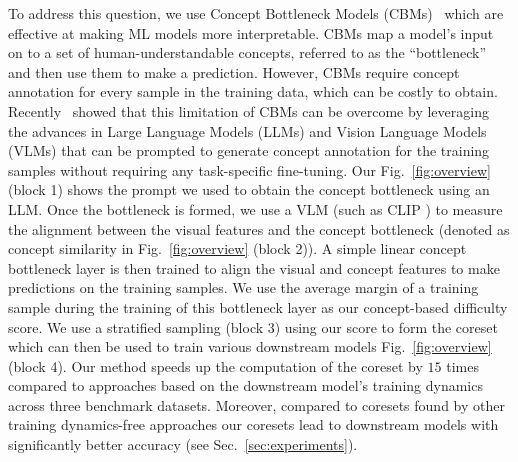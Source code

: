 To address this question, we use Concept Bottleneck Models (CBMs)~\cite{koh2020concept,yuksekgonul2022post} which are effective at making ML models more interpretable. 
CBMs map a model's input on to a set of human-understandable concepts, referred to as the ``bottleneck'' and then use them to make a prediction. 
However, CBMs require concept annotation for every sample in the training data, which can be costly to obtain. 
Recently~\cite{yang2023language,yan2023learning} showed that this limitation of CBMs can be overcome by leveraging the advances in Large Language Models (LLMs) and Vision Language Models (VLMs) that can be prompted to generate concept annotation for the training samples without requiring any task-specific fine-tuning.  
Our Fig.~\ref{fig:overview} (block 1) shows the prompt we used to obtain the concept bottleneck using an LLM.
Once the bottleneck is formed, we use a VLM (such as CLIP \cite{radford2021learning}) to measure the alignment between the visual features and the concept bottleneck (denoted as concept similarity in Fig.~\ref{fig:overview} (block 2)). 
A simple linear concept bottleneck layer is then trained to align the visual and concept features to make predictions on the training samples. 
We use the average margin of a training sample during the training of this bottleneck layer as our concept-based difficulty score. %
We use a stratified sampling \cite{zheng2022coverage} (block 3) using our score to form the coreset which can then be used to train various downstream models Fig.~\ref{fig:overview} (block 4). 
Our method speeds up the computation of the coreset by $15$ times compared to approaches based on the downstream model's training dynamics across three benchmark datasets. %
Moreover, compared to coresets found by other training dynamics-free approaches our coresets lead to downstream models with significantly better accuracy (see Sec.~\ref{sec:experiments}). %

